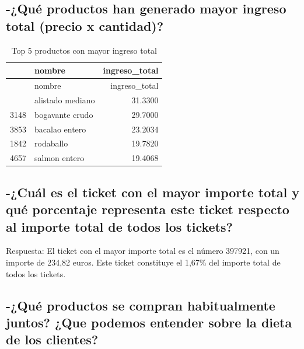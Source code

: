 \documentclass[,article,submit,moreauthors,pdftex]{Definitions/mdpi}
\begin{document}
\hypertarget{quuxe9-productos-han-generado-mayor-ingreso-total-precio-x-cantidad}{%
\subsection{-¿Qué productos han generado mayor ingreso total (precio x
cantidad)?}\label{quuxe9-productos-han-generado-mayor-ingreso-total-precio-x-cantidad}}

\begin{longtable}[]{@{}llr@{}}
\caption{Top 5 productos con mayor ingreso total}\tabularnewline
\toprule\noalign{}
& nombre & ingreso\_total \\
\midrule\noalign{}
\endfirsthead
\toprule\noalign{}
& nombre & ingreso\_total \\
\midrule\noalign{}
\endhead
\bottomrule\noalign{}
\endlastfoot
375 & alistado mediano & 31.3300 \\
3148 & bogavante crudo & 29.7000 \\
3853 & bacalao entero & 23.2034 \\
1842 & rodaballo & 19.7820 \\
4657 & salmon entero & 19.4068 \\
\end{longtable}

\hypertarget{cuuxe1l-es-el-ticket-con-el-mayor-importe-total-y-quuxe9-porcentaje-representa-este-ticket-respecto-al-importe-total-de-todos-los-tickets}{%
\subsection{-¿Cuál es el ticket con el mayor importe total y qué
porcentaje representa este ticket respecto al importe total de todos los
tickets?}\label{cuuxe1l-es-el-ticket-con-el-mayor-importe-total-y-quuxe9-porcentaje-representa-este-ticket-respecto-al-importe-total-de-todos-los-tickets}}

Respuesta: El ticket con el mayor importe total es el número 397921, con
un importe de 234,82 euros. Este ticket constituye el 1,67\% del importe
total de todos los tickets.

\par

\hypertarget{quuxe9-productos-se-compran-habitualmente-juntos-que-podemos-entender-sobre-la-dieta-de-los-clientes}{%
\subsection{-¿Qué productos se compran habitualmente juntos? ¿Que
podemos entender sobre la dieta de los
clientes?}\label{quuxe9-productos-se-compran-habitualmente-juntos-que-podemos-entender-sobre-la-dieta-de-los-clientes}}
\end{document}
